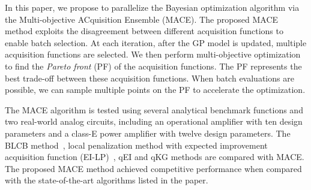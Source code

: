 In this paper, we propose to parallelize the Bayesian optimization algorithm
via the Multi-objective ACquisition Ensemble (MACE). The proposed MACE method
exploits the disagreement between different acquisition functions to enable
batch selection. At each iteration, after the GP model is updated, multiple
acquisition functions are selected. We then perform multi-objective
optimization to find the \emph{Pareto front} (PF) of the acquisition functions.
The PF represents the best trade-off between these acquisition functions. When
batch evaluations are possible, we can sample multiple points on the PF to accelerate the optimization.

The MACE algorithm is tested using several analytical benchmark functions and
two real-world analog circuits, including an operational amplifier with ten
design parameters and a class-E power amplifier with twelve design parameters.
The BLCB method~\cite{desautels2014parallelizing}, local penalization method with expected improvement
acquisition function (EI-LP)~\cite{gonzalez2016batch}, qEI \cite{qEI} and qKG \cite{wu2016parallel} methods are compared with
MACE. The proposed MACE method achieved competitive performance when compared
with the state-of-the-art algorithms listed in the paper.
